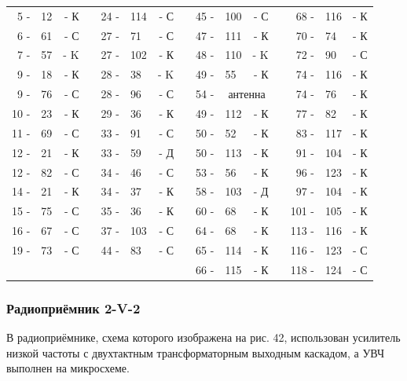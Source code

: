 \documentclass[12pt]{article}
\newcommand{\mc}{\multicolumn}
\begin{document}
\begin{tabular}{r l r p{0.5cm} r l r p{0.5cm} r l r p{0.5cm} r l r}
 5 - & 12  & - К &     & 24 - & 114 & - С &      &  45 - & 100 & - С          &     &  68 - & 116 & - К\\
 6 - & 61  & - С &     & 27 - &  71 & - С &      &  47 - & 111 & - К          &     &  70 - &  74 & - К\\
 7 - & 57  & - K &     & 27 - & 102 & - К &      &  48 - & 110 & - K          &     &  72 - &  90 & - С\\
 9 - & 18  & - К &     & 28 - &  38 & - K &      &  49 - &  55 & - К          &     &  74 - & 116 & - К\\
 9 - & 76  & - С &     & 28 - &  96 & - С &      &  54 - & \mc{2}{c}{антенна} &     &  74 - &  76 & - К\\
10 - & 23  & - К &     & 29 - &  36 & - К &      &  49 - & 112 & - К          &     &  77 - &  82 & - К\\
11 - & 69  & - С &     & 33 - &  91 & - С &      &  50 - &  52 & - К          &     &  83 - & 117 & - К\\
12 - & 21  & - К &     & 33 - &  59 & - Д &      &  50 - & 113 & - К          &     &  91 - & 104 & - К\\
12 - & 82  & - С &     & 34 - &  46 & - С &      &  53 - &  56 & - К          &     &  96 - & 123 & - К\\
14 - & 21  & - К &     & 34 - &  37 & - К &      &  58 - & 103 & - Д          &     &  97 - & 104 & - К\\
15 - & 75  & - С &     & 35 - &  36 & - К &      &  60 - &  68 & - К          &     & 101 - & 105 & - К\\
16 - & 67  & - С &     & 37 - & 103 & - С &      &  64 - &  68 & - К          &     & 113 - & 116 & - К\\
19 - & 73  & - С &     & 44 - &  83 & - С &      &  65 - & 114 & - К          &     & 116 - & 123 & - С\\
     &     &     &     &      &     &     &      &  66 - & 115 & - К          &     & 118 - & 124 & - С\\
\end{tabular}

\hrulefill

\subsubsection{Радиоприёмник 2-V-2}

В радиоприёмнике, схема которого изображена на рис. 42, использован усилитель низкой частоты с двухтактным трансформаторным выходным каскадом, а УВЧ выполнен на микросхеме.
\end{document}

